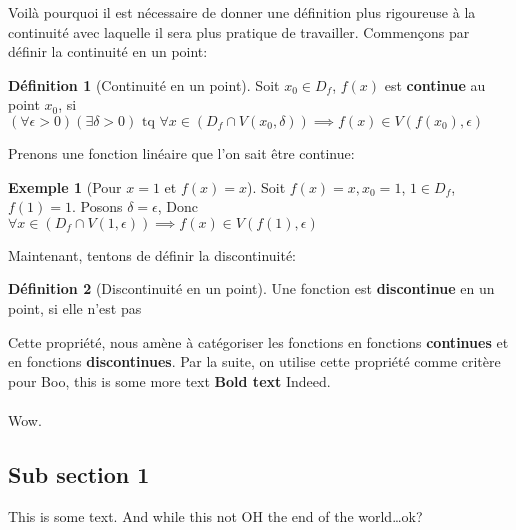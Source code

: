 \documentclass[12pt]{book}
\def\sep{\phantom{}}
\theoremstyle{definition}
\newtheorem{definition}{Définition}[section]
\newtheorem*{example}{Exemple}
\begin{document}
Voilà pourquoi il est nécessaire de donner une définition plus rigoureuse à la continuité avec laquelle il sera plus pratique de travailler. Commençons
par définir la continuité en un point:
\begin{definition}[Continuité en un point]
    \label{def:continue-1-point}
    Soit $x_0 \in D_f$, $f(x)$ est \textbf{continue} au point $x_0$, si $(\forall \epsilon > 0)(\exists \delta > 0)\text{ tq }\forall x \in (D_f \cap V(x_0, \delta)) \implies f(x) \in V(f(x_0), \epsilon)$
\end{definition}
Prenons une fonction linéaire que l'on sait être continue:
\begin{example}[Pour $x=1$ et $f(x) = x$]
    Soit $f(x) = x, x_0 = 1$, $1 \in D_f$, $f(1) = 1$. \sep Posons $\delta = \epsilon$, \sep Donc $\forall x \in (D_f \cap V(1, \epsilon)) \implies f(x) \in V(f(1), \epsilon)$
\end{example}
\begin{comment}
    On part avec nos hypothèses, on cherche à voir si au point x=1 ($x_0$), la fonction est continue. \sep
    Toujours dans l'idée que lorsque l'on cherche une proposition y de vraie pour tout x, l'idéal est de poser y en fonction de x \sep
    $f(x) = x$ et $f(1) = 1$, donc on ne fait que remplacer $\delta$ par $\epsilon$ et $f(x)$ par $x$ pour constater que c'est vrai.
\end{comment}
Maintenant, tentons de définir la discontinuité:
\begin{definition}[Discontinuité en un point]
    \label{def:discontinue-1-point}
    Une fonction est \textbf{discontinue} en un point, si elle n'est pas
\end{definition}

Cette propriété, nous amène à catégoriser les fonctions en fonctions \textbf{continues} et en fonctions \textbf{discontinues}. 
Par la suite, on utilise cette propriété comme critère pour 
Boo, this is some more text \textbf{Bold text} Indeed. \\
\\
Wow.
\subsection{Sub section 1}
This is some text. And while this not  OH
the end of the world\dots ok?
\end{document}
